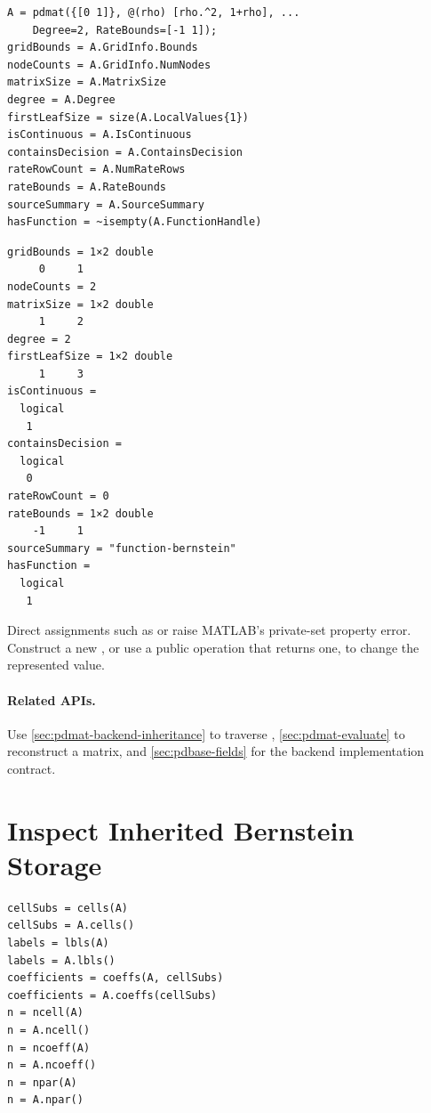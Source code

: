 \examplehead
\begin{lstlisting}[style=dpmatlab]
A = pdmat({[0 1]}, @(rho) [rho.^2, 1+rho], ...
    Degree=2, RateBounds=[-1 1]);
gridBounds = A.GridInfo.Bounds
nodeCounts = A.GridInfo.NumNodes
matrixSize = A.MatrixSize
degree = A.Degree
firstLeafSize = size(A.LocalValues{1})
isContinuous = A.IsContinuous
containsDecision = A.ContainsDecision
rateRowCount = A.NumRateRows
rateBounds = A.RateBounds
sourceSummary = A.SourceSummary
hasFunction = ~isempty(A.FunctionHandle)
\end{lstlisting}
\begin{lstlisting}[style=dpoutput]
gridBounds = 1×2 double
     0     1
nodeCounts = 2
matrixSize = 1×2 double
     1     2
degree = 2
firstLeafSize = 1×2 double
     1     3
isContinuous =
  logical
   1
containsDecision =
  logical
   0
rateRowCount = 0
rateBounds = 1×2 double
    -1     1
sourceSummary = "function-bernstein"
hasFunction =
  logical
   1
\end{lstlisting}

Direct assignments such as  or  raise MATLAB's private-set property error. Construct a new , or use a public operation that returns one, to change the represented value.

\paragraph{Related APIs.}
Use \cref{sec:pdmat-backend-inheritance} to traverse , \cref{sec:pdmat-evaluate} to reconstruct a matrix, and \cref{sec:pdbase-fields} for the backend implementation contract.


\section{Inspect Inherited Bernstein Storage}
\label{sec:pdmat-backend-inheritance}

\syntaxhead
\begin{lstlisting}[style=dpsyntax]
cellSubs = cells(A)
cellSubs = A.cells()
labels = lbls(A)
labels = A.lbls()
coefficients = coeffs(A, cellSubs)
coefficients = A.coeffs(cellSubs)
n = ncell(A)
n = A.ncell()
n = ncoeff(A)
n = A.ncoeff()
n = npar(A)
n = A.npar()
\end{lstlisting}

